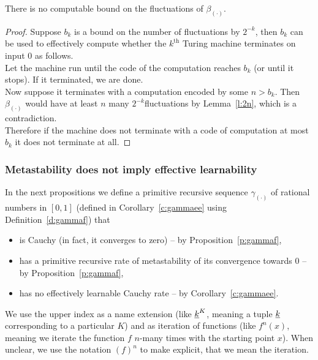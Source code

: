 \begin{prop}\label{p:alphaHasNoFlucBd}
There is no computable bound on the fluctuations of $\beta_{(\cdot)}$.
\end{prop}
\begin{proof}
Suppose $b_k$ is a bound on the number of fluctuations by $2^{-k}$, 
then $b_k$ can be used to effectively compute whether the $k^{\text{th}}$ Turing machine terminates on input $0$ as follows.\\
Let the machine run until the code of the computation reaches $b_k$ (or until it stops). If it terminated, we are done.\\
Now suppose it terminates with a computation encoded by some $n>b_k$. Then $\beta_{(\cdot)}$ would have at least $n$ many $2^{-k}$\nbd fluctuations by Lemma~\ref{l:2n}, which is a contradiction.\\
Therefore if the machine does not terminate with a code of computation at most $b_k$ it does not terminate at all.
\end{proof}


\subsubsection*{Metastability does not imply effective learnability} \label{section4.2}

In the next propositions we define a primitive recursive sequence 
$\gamma_{(\cdot)}$ of rational numbers in $[0,1]$ 
(defined in Corollary~\ref{c:gammaee} using Definition~\ref{d:gammaf}) that
\begin{itemize}
\item is Cauchy (in fact, it converges to zero) -- by 
Proposition~\ref{p:gammaf},
\item has a primitive recursive rate of metastability of its 
convergence towards $0$ -- by Proposition~\ref{p:gammaf},
\item has no effectively learnable Cauchy rate -- by Corollary~\ref{c:gammaee}.
\end{itemize}

We use the upper index as a name extension (like $\underline k^K$, meaning a tuple $\underline k$ corresponding to a particular $K$) and as iteration of functions (like $f^n(x)$, meaning we iterate the function $f$ $n$-many times with the starting point $x$). When unclear, we use the notation $(f)^n$ to make explicit, that we mean the iteration.

